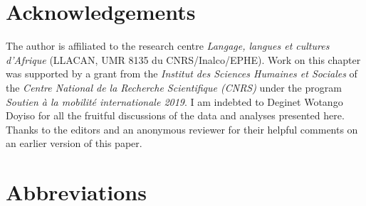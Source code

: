 \documentclass[output=paper,colorlinks,citecolor=brown,draftmode
]{langscibook}
\begin{document}
\section*{Acknowledgements}
The author is affiliated to the research centre \textit{Langage, langues et cultures d’Afrique} (LLACAN, UMR 8135 du CNRS/Inalco/EPHE). Work on this chapter was supported by a grant from the \textit{Institut des Sciences Humaines et Sociales} of the \textit{Centre National de la Recherche Scientifique (CNRS)} under the program \textit{Soutien à la mobilité internationale 2019}. I am indebted to Deginet Wotango Doyiso for all the fruitful discussions of the data and analyses presented here. Thanks to the editors and an anonymous reviewer for their helpful comments on an earlier version of this paper.

 
\section*{Abbreviations}
\end{document}
